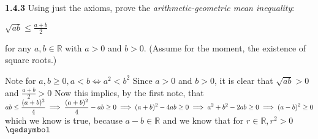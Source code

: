 \documentclass[12pt]{article}
\newcommand{\R}{\mathbb{R}}
\begin{document}
\begin{problem}\textbf{1.4.3}
Using just the axioms, prove the \textit{arithmetic-geometric mean inequality}:
\begin{center}
    $\sqrt{ab}\leq\displaystyle\frac{a+b}{2}$
\end{center}
for any $a,b\in\R$ with $a>0$ and $b>0$. (Assume for the moment, the existence of square roots.)
\end{problem}
\begin{solution}\newline
Note for $a,b\geq0, a<b\iff a^2<b^2$\newline\newline
Since $a>0$ and $b>0$, it is clear that $\sqrt{ab}>0$ and $\displaystyle\frac{a+b}{2}>0$\newline
Now this implies, by the first note, that $ab\leq\displaystyle\frac{(a+b)^2}{4}\newline
\implies \displaystyle\frac{(a+b)^2}{4}-ab\geq0\newline
\implies \displaystyle(a+b)^2-4ab\geq0\newline
\implies a^2+b^2-2ab\geq0\newline
\implies(a-b)^2\geq0$ which we know is true, because $a-b\in\R$ and we know that for $r\in\R, r^2>0$\flushright$\qedsymbol$
\end{solution}
\end{document}
